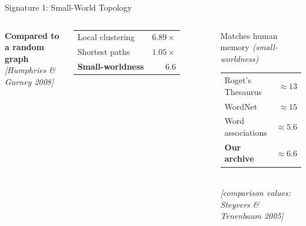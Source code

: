 \documentclass[aspectratio=169, 12pt]{beamer}
\begin{document}
\begin{frame}{Signature 1: Small-World Topology}
\begin{columns}[T]

        \vspace{0.15cm}

        \textbf{Compared to a random graph}\\[-1pt]
        {\tiny\itshape\color{gray} [Humphries \& Gurney 2008]}

        \vspace{0.05cm}
        {\small
        \begin{tabular}{@{}lr@{}}
            \toprule
            Local clustering & $\mathbf{6.89\times}$ \\
            Shortest paths   & $1.05\times$ \\
            \midrule
            \textbf{Small-worldness} & $\mathbf{6.6}$ \\
            \bottomrule
        \end{tabular}}

        \vspace{0.15cm}

        \begin{block}{Matches human memory \textnormal{\itshape\footnotesize (small-worldness)}}
            \small
            \begin{tabular}{@{}lr@{}}
                Roget's Thesaurus   & $\approx 13$ \\
                WordNet             & $\approx 15$ \\
                Word associations   & $\approx 5.6$ \\
                \textbf{Our archive}        & $\boldsymbol{\approx 6.6}$ \\
            \end{tabular}\\[2pt]
            {\tiny\itshape\color{gray} [comparison values: Steyvers \& Tenenbaum 2005]}
        \end{block}
    \end{columns}


\end{frame}
\end{document}
